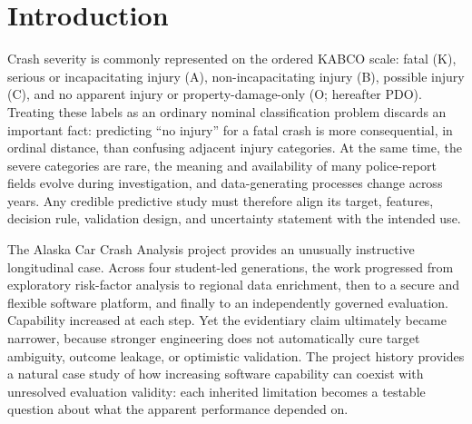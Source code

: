 \documentclass[11pt,letterpaper]{article}
\newcommand{\projectname}{Alaska Car Crash Analysis}
\begin{document}
\clearpage
{}
\begin{singlespace}
\tableofcontents
\end{singlespace}

\clearpage
{}
\begin{singlespace}
\listoffigures
\end{singlespace}

\clearpage
{}
\begin{singlespace}
\listoftables
\end{singlespace}

\clearpage
{}
\setcounter{page}{1}

\section{Introduction}
Crash severity is commonly represented on the ordered KABCO scale: fatal (K), serious or incapacitating injury (A), non-incapacitating injury (B), possible injury (C), and no apparent injury or property-damage-only (O; hereafter PDO). Treating these labels as an ordinary nominal classification problem discards an important fact: predicting ``no injury'' for a fatal crash is more consequential, in ordinal distance, than confusing adjacent injury categories. At the same time, the severe categories are rare, the meaning and availability of many police-report fields evolve during investigation, and data-generating processes change across years. Any credible predictive study must therefore align its target, features, decision rule, validation design, and uncertainty statement with the intended use.

The \projectname{} project provides an unusually instructive longitudinal case. Across four student-led generations, the work progressed from exploratory risk-factor analysis to regional data enrichment, then to a secure and flexible software platform, and finally to an independently governed evaluation. Capability increased at each step. Yet the evidentiary claim ultimately became narrower, because stronger engineering does not automatically cure target ambiguity, outcome leakage, or optimistic validation. The project history provides a natural case study of how increasing software capability can coexist with unresolved evaluation validity: each inherited limitation becomes a testable question about what the apparent performance depended on.
\end{document}
